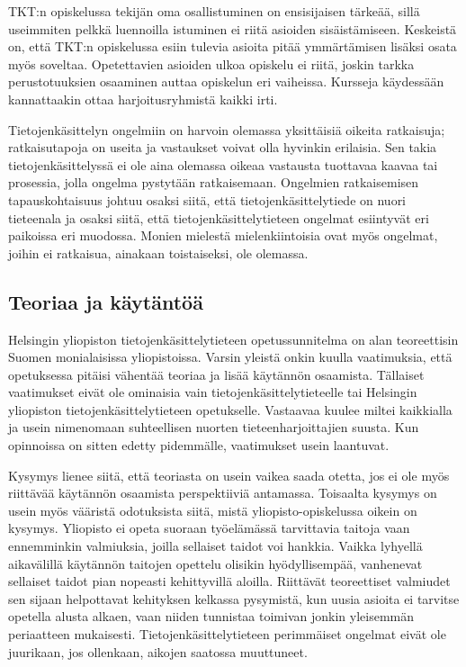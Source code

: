 \documentclass[../ala_hataile.tex]{subfiles}
\begin{document}
	TKT:n opiskelussa tekijän oma osallistuminen
	on ensisijaisen tärkeää, sillä useimmiten pelkkä
	luennoilla istuminen ei riitä asioiden sisäistämiseen. 
	Keskeistä on, että TKT:n opiskelussa esiin tulevia asioita
	pitää ymmärtämisen lisäksi osata myös
	soveltaa. Opetettavien asioiden ulkoa opiskelu
	ei riitä, joskin tarkka perus\-totuuksien
	osaaminen auttaa opiskelun eri vaiheissa. Kursseja 
	käydessään kannattaakin ottaa harjoitusryhmistä kaikki irti.
	
	Tietojenkäsittelyn ongelmiin on harvoin
	olemassa yksittäisiä oikeita ratkaisuja; ratkaisutapoja
	on useita ja vastaukset voivat
	olla hyvinkin erilaisia. Sen takia tietojenkäsittelyssä
	ei ole aina olemassa oikeaa
	vastausta tuottavaa kaavaa tai prosessia,
	jolla ongelma pystytään ratkaisemaan. Ongelmien
	ratkaisemisen tapauskohtaisuus
	johtuu osaksi siitä, että tietojen\-käsittely\-tiede
	on nuori tieteenala ja osaksi siitä, että
	tietojen\-käsittely\-tieteen ongelmat esiintyvät
	eri paikoissa eri muodossa. Monien mielestä
	mielenkiintoisia ovat myös ongelmat,
	joihin ei ratkaisua, ainakaan toistaiseksi,
	ole olemassa.
	
	\subsection*{Teoriaa ja käytäntöä}
	Helsingin yliopiston tietojen\-käsittely\-tieteen opetus\-sunnitelma on
	alan teoreettisin Suomen monialaisissa
	yliopistoissa. Varsin yleistä onkin kuulla
	vaatimuksia, että opetuksessa pitäisi vähentää
	teoriaa ja lisää käytännön osaamista.
	Tällaiset vaatimukset eivät ole ominaisia
	vain tietojen\-käsittely\-tieteelle tai Helsingin
	yliopiston tietojen\-käsittely\-tieteen opetukselle.
	Vastaavaa kuulee miltei kaikkialla
	ja usein nimenomaan suhteellisen nuorten
	tieteenharjoittajien suusta. Kun opinnoissa
	on sitten edetty pidemmälle, vaatimukset
	usein laantuvat.
	
	Kysymys lienee siitä, että teoriasta on
	usein vaikea saada otetta, jos ei ole myös
	riittävää käytännön osaamista perspektiiviä
	antamassa. Toisaalta kysymys on
	usein myös vääristä odotuksista siitä, mistä
	yliopisto-opiskelussa oikein on kysymys.
	Yliopisto ei opeta suoraan työelämässä
	tarvittavia taitoja vaan ennemminkin valmiuksia,
	joilla sellaiset taidot voi hankkia.
	Vaikka lyhyellä aikavälillä käytännön
	taitojen opettelu olisikin hyödyllisempää,
	vanhenevat sellaiset taidot pian nopeasti
	kehittyvillä aloilla. Riittävät teoreettiset
	valmiudet sen sijaan helpottavat kehityksen
	kelkassa pysymistä, kun uusia asioita ei
	tarvitse opetella alusta alkaen, vaan niiden 
	tunnistaa toimivan jonkin yleisemmän periaatteen
	mukaisesti. Tietojen\-käsittely\-tieteen
	perimmäiset ongelmat eivät ole juurikaan,
	jos ollenkaan, aikojen saatossa muuttuneet.
	
\end{document}
